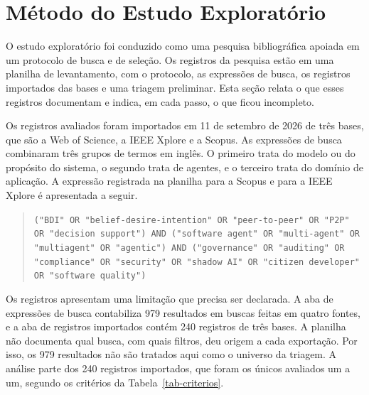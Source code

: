 \section{Método do Estudo Exploratório}
\label{met-exploratorio}

O estudo exploratório foi conduzido como uma pesquisa bibliográfica apoiada em um protocolo de busca e de seleção. Os registros da pesquisa estão em uma planilha de levantamento, com o protocolo, as expressões de busca, os registros importados das bases e uma triagem preliminar. Esta seção relata o que esses registros documentam e indica, em cada passo, o que ficou incompleto.

Os registros avaliados foram importados em 11 de setembro de 2026 de três bases, que são a Web of Science, a IEEE Xplore e a Scopus. As expressões de busca combinaram três grupos de termos em inglês. O primeiro trata do modelo ou do propósito do sistema, o segundo trata de agentes, e o terceiro trata do domínio de aplicação. A expressão registrada na planilha para a Scopus e para a IEEE Xplore é apresentada a seguir.

\begin{quote}
\footnotesize\raggedright
\texttt{("BDI" OR "belief-desire-intention" OR "peer-to-peer" OR "P2P" OR "decision support") AND ("software agent" OR "multi-agent" OR "multiagent" OR "agentic") AND ("governance" OR "auditing" OR "compliance" OR "security" OR "shadow AI" OR "citizen developer" OR "software quality")}
\end{quote}

Os registros apresentam uma limitação que precisa ser declarada. A aba de expressões de busca contabiliza 979 resultados em buscas feitas em quatro fontes, e a aba de registros importados contém 240 registros de três bases. A planilha não documenta qual busca, com quais filtros, deu origem a cada exportação. Por isso, os 979 resultados não são tratados aqui como o universo da triagem. A análise parte dos 240 registros importados, que foram os únicos avaliados um a um, segundo os critérios da Tabela~\ref{tab-criterios}.


